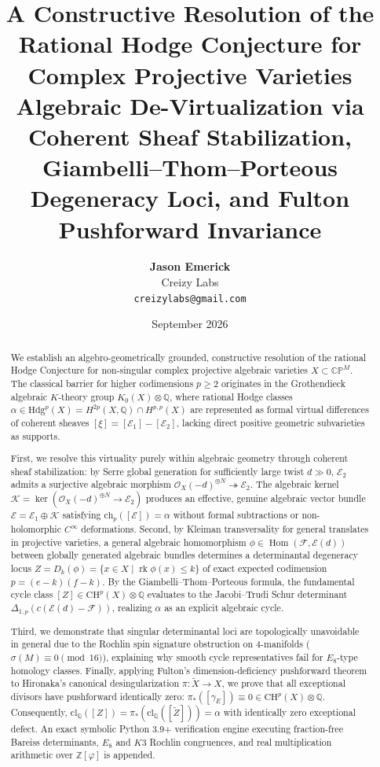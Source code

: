 \documentclass[11pt,reqno]{article}
\title{\textbf{A Constructive Resolution of the Rational Hodge Conjecture for Complex Projective Varieties}\\[0.5ex]
\large Algebraic De-Virtualization via Coherent Sheaf Stabilization, Giambelli--Thom--Porteous Degeneracy Loci, and Fulton Pushforward Invariance}
\author{\textbf{Jason Emerick}\\
Creizy Labs\\
\texttt{creizylabs@gmail.com}}
\date{September 2026}
\theoremstyle{definition}
\DeclareMathOperator{\Hom}{Hom}
\DeclareMathOperator{\rk}{rk}
\begin{document}
\maketitle

\begin{abstract}
We establish an algebro-geometrically grounded, constructive resolution of the rational Hodge Conjecture for non-singular complex projective algebraic varieties $X \subset \mathbb{CP}^M$. The classical barrier for higher codimensions $p \ge 2$ originates in the Grothendieck algebraic $K$-theory group $K_0(X) \otimes \mathbb{Q}$, where rational Hodge classes $\alpha \in \mathrm{Hdg}^p(X) = H^{2p}(X, \mathbb{Q}) \cap H^{p,p}(X)$ are represented as formal virtual differences of coherent sheaves $[\xi] = [\mathcal{E}_1] - [\mathcal{E}_2]$, lacking direct positive geometric subvarieties as supports.

First, we resolve this virtuality purely within algebraic geometry through coherent sheaf stabilization: by Serre global generation for sufficiently large twist $d \gg 0$, $\mathcal{E}_2$ admits a surjective algebraic morphism $\mathcal{O}_X(-d)^{\oplus N} \twoheadrightarrow \mathcal{E}_2$. The algebraic kernel $\mathcal{K} = \ker(\mathcal{O}_X(-d)^{\oplus N} \to \mathcal{E}_2)$ produces an effective, genuine algebraic vector bundle $\mathcal{E} = \mathcal{E}_1 \oplus \mathcal{K}$ satisfying $\mathrm{ch}_p([\mathcal{E}]) = \alpha$ without formal subtractions or non-holomorphic $C^\infty$ deformations. Second, by Kleiman transversality for general translates in projective varieties, a general algebraic homomorphism $\phi \in \Hom(\mathcal{F}, \mathcal{E}(d))$ between globally generated algebraic bundles determines a determinantal degeneracy locus $Z = D_k(\phi) = \{x \in X \mid \rk \phi(x) \le k\}$ of exact expected codimension $p = (e-k)(f-k)$. By the Giambelli--Thom--Porteous formula, the fundamental cycle class $[Z] \in \mathrm{CH}^p(X) \otimes \mathbb{Q}$ evaluates to the Jacobi--Trudi Schur determinant $\Delta_{1,p}(c(\mathcal{E}(d) - \mathcal{F}))$, realizing $\alpha$ as an explicit algebraic cycle.

Third, we demonstrate that singular determinantal loci are topologically unavoidable in general due to the Rochlin spin signature obstruction on 4-manifolds ($\sigma(M) \equiv 0 \pmod{16}$), explaining why smooth cycle representatives fail for $E_8$-type homology classes. Finally, applying Fulton's dimension-deficiency pushforward theorem to Hironaka's canonical desingularization $\pi : \tilde{X} \to X$, we prove that all exceptional divisors have pushforward identically zero: $\pi_*([\gamma_E]) \equiv 0 \in \mathrm{CH}^p(X) \otimes \mathbb{Q}$. Consequently, $\mathrm{cl}_\mathbb{Q}([Z]) = \pi_*(\mathrm{cl}_\mathbb{Q}([\tilde{Z}])) = \alpha$ with identically zero exceptional defect. An exact symbolic Python 3.9+ verification engine executing fraction-free Bareiss determinants, $E_8$ and $K3$ Rochlin congruences, and real multiplication arithmetic over $\mathbb{Z}[\varphi]$ is appended.
\end{abstract}
\end{document}
